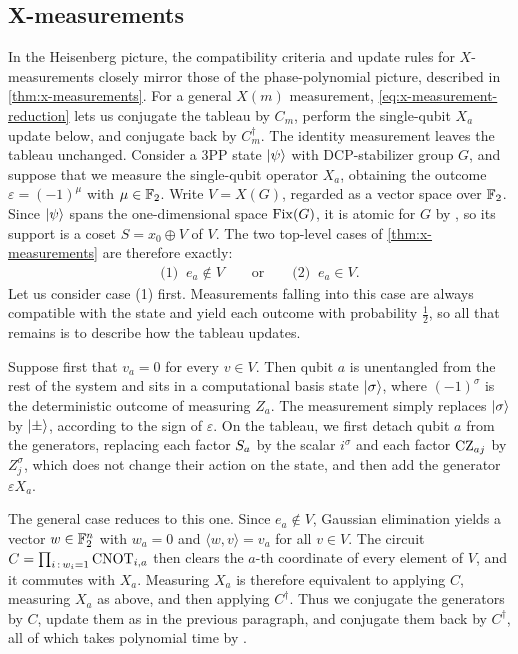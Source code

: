 \subsection{X-measurements}
In the Heisenberg picture, the compatibility criteria and update rules for $X$-measurements closely mirror those of the phase-polynomial picture, described in \cref{thm:x-measurements}.
For a general $X(m)$ measurement, \cref{eq:x-measurement-reduction} lets us conjugate the tableau by $C_m$, perform the single-qubit $X_a$ update below, and conjugate back by $C_m^\dagger$. The identity measurement leaves the tableau unchanged.
Consider a 3PP state $\ket{\psi}$ with DCP-stabilizer group $G$, and suppose that we measure the single-qubit operator $X_a$, obtaining the outcome $\varepsilon = (-1)^\mu$ with $\mu \in \F_2$. Write $V = X(G)$, regarded as a vector space over $\F_2$.
Since $\ket{\psi}$ spans the one-dimensional space $\Fix(G)$, it is atomic for $G$ by , so its support is a coset $S = x_0 \oplus V$ of $V$.
The two top-level cases of \cref{thm:x-measurements} are therefore exactly:
\begin{align}
    \text{(1)}\;\; e_a \not\in V
    \qquad\text{or}\qquad
    \text{(2)}\;\; e_a \in V.
\end{align}
Let us consider case (1) first. Measurements falling into this case are always compatible with the state and yield each outcome with probability $\tfrac12$, so all that remains is to describe how the tableau updates.

Suppose first that $v_a = 0$ for every $v \in V$.
Then qubit $a$ is unentangled from the rest of the system and sits in a computational basis state $\ket{\sigma}$, where $(-1)^\sigma$ is the deterministic outcome of measuring $Z_a$. The measurement simply replaces $\ket{\sigma}$ by $\ket{\pm}$, according to the sign of $\varepsilon$.
On the tableau, we first detach qubit $a$ from the generators, replacing each factor $\S_a$ by the scalar $i^\sigma$ and each factor $\CZ_{aj}$ by $Z_j^\sigma$, which does not change their action on the state, and then add the generator $\varepsilon X_a$.

The general case reduces to this one. Since $e_a \not\in V$, Gaussian elimination yields a vector $w \in \F_2^n$ with $w_a = 0$ and $\langle w, v \rangle = v_a$ for all $v \in V$. The circuit $C = \prod_{i \,:\, w_i = 1} \CNOT_{i,a}$ then clears the $a$-th coordinate of every element of $V$, and it commutes with $X_a$. Measuring $X_a$ is therefore equivalent to applying $C$, measuring $X_a$ as above, and then applying $C^\dagger$. Thus we conjugate the generators by $C$, update them as in the previous paragraph, and conjugate them back by $C^\dagger$, all of which takes polynomial time by .

